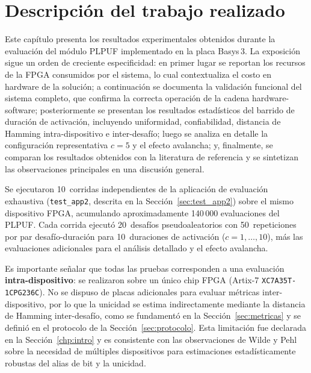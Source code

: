 
\chapter{Descripción del trabajo realizado}
\label{ch:trabajo}

Este capítulo presenta los resultados experimentales obtenidos durante la
evaluación del módulo PLPUF implementado en la placa Basys\,3. La
exposición sigue un orden de creciente especificidad: en primer lugar se
reportan los recursos de la FPGA consumidos por el sistema, lo cual
contextualiza el costo en hardware de la solución; a continuación se
documenta la validación funcional del sistema completo, que confirma la
correcta operación de la cadena hardware-software; posteriormente se
presentan los resultados estadísticos del barrido de duración de activación,
incluyendo uniformidad, confiabilidad, distancia de Hamming
intra-dispositivo e inter-desafío; luego se analiza en detalle la
configuración representativa $c = 5$ y el efecto avalancha; y, finalmente,
se comparan los resultados obtenidos con la literatura de referencia y se
sintetizan las observaciones principales en una discusión general.

Se ejecutaron 10~corridas independientes de la aplicación de evaluación
exhaustiva (\texttt{test\_app2}, descrita en la Sección~\ref{sec:test_app2})
sobre el mismo dispositivo FPGA, acumulando aproximadamente
140\,000 evaluaciones del PLPUF. Cada corrida ejecutó 20~desafíos
pseudoaleatorios con 50~repeticiones por par desafío-duración para
10~duraciones de activación ($c = 1, \ldots, 10$), más las evaluaciones
adicionales para el análisis detallado y el efecto avalancha.

Es importante señalar que todas las pruebas corresponden a una evaluación
\textbf{intra-dispositivo}: se realizaron sobre un único chip FPGA
(Artix-7 \texttt{XC7A35T-1CPG236C}). No se dispuso de placas adicionales
para evaluar métricas inter-dispositivo, por lo que la unicidad se estima
indirectamente mediante la distancia de Hamming inter-desafío, como se
fundamentó en la Sección~\ref{sec:metricas} y se definió en el protocolo de
la Sección~\ref{sec:protocolo}. Esta limitación fue declarada en la
Sección~\ref{chp:intro} y es consistente con las observaciones de
Wilde y Pehl~\cite{wilde_2020_confidence} sobre la necesidad de múltiples
dispositivos para estimaciones estadísticamente robustas del alias de bit y
la unicidad.

